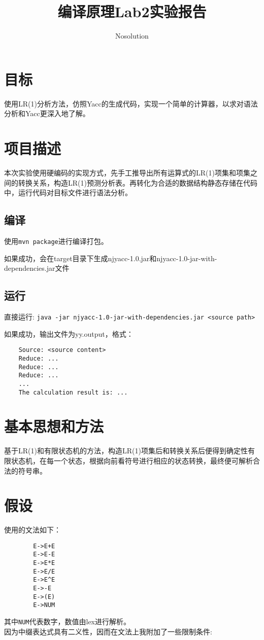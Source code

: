 \documentclass[a4paper]{ctexart} %
\title{编译原理Lab2实验报告}
\author{Nosolution}
\date{}
\begin{document}
	\maketitle

	\section{目标}
	使用LR(1)分析方法，仿照Yacc的生成代码，实现一个简单的计算器，以求对语法分析和Yacc更深入地了解。

	\section{项目描述}
	本次实验使用硬编码的实现方式，先手工推导出所有运算式的LR(1)项集和项集之间的转换关系，构造LR(1)预测分析表。再转化为合适的数据结构静态存储在代码中，运行代码对目标文件进行语法分析。

	\subsection{编译}
	使用\verb|mvn package|进行编译打包。

	如果成功，会在target目录下生成njyacc-1.0.jar和njyacc-1.0-jar-with-dependencies.jar文件

	\subsection{运行}

	直接运行: \verb|java -jar njyacc-1.0-jar-with-dependencies.jar <source path>|

	如果成功，输出文件为yy.output，格式：
	\begin{verbatim}
    Source: <source content>
    Reduce: ...
    Reduce: ...
    Reduce: ...
    ...
    The calculation result is: ...
	\end{verbatim}


	\section{基本思想和方法}
	基于LR(1)和有限状态机的方法，构造LR(1)项集后和转换关系后便得到确定性有限状态机，在每一个状态，根据向前看符号进行相应的状态转换，最终便可解析合法的符号串。

	\section{假设}
	使用的文法如下：
	\begin{verbatim}
        E->E+E
        E->E-E
        E->E*E
        E->E/E
        E->E^E
        E->-E
        E->(E)
        E->NUM
	\end{verbatim}
	其中\verb|NUM|代表数字，数值由lex进行解析。\\
	因为中缀表达式具有二义性，因而在文法上我附加了一些限制条件:
\end{document}
